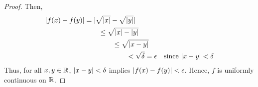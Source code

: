 \begin{problem}
\begin{enumroman}
\begin{answer}
\begin{claim}
\begin{proof}
            Then,
            \begin{align*}
              \lvert f(x) - f(y)\rvert &= \lvert\sqrt{\lvert x\rvert} - \sqrt{\lvert y\rvert}\rvert \\
                &\qquad \leq \sqrt{\lvert x\rvert - \lvert y\rvert} \\
                &\qquad \qquad\leq \sqrt{\lvert x - y\rvert} \\
                &\qquad \qquad \qquad< \sqrt{\delta} = \epsilon &\text{since $\lvert x - y\rvert < \delta$}
            \end{align*}
            Thus, for all $x, y \in \mathbb{R}$, $\lvert x - y\rvert < \delta$ implies $\lvert f(x) - f(y)\rvert < \epsilon$.
            Hence, $f$ is uniformly continuous on $\mathbb{R}$.
          \end{proof}
        \end{claim}
      \end{answer}
  \end{enumroman}
\end{problem}
